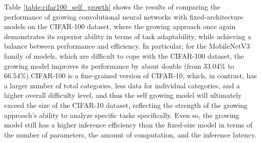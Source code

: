 \documentclass[preprint,12pt]{elsarticle}
\begin{document}
Table \ref{table:cifar100_self_growth} shows the results of comparing the performance of growing convolutional neural networks with fixed-architecture models on the CIFAR-100 dataset, where the growing approach once again demonstrates its superior ability in terms of task adaptability, while achieving a balance between performance and efficiency. In particular, for the MobileNetV3 family of models, which are difficult to cope with the CIFAR-100 dataset, the growing model improves its performance by about double (from 33.04\% to 66.54\%).CIFAR-100 is a fine-grained version of CIFAR-10, which, in contrast, has a larger number of total categories, less data for individual categories, and a higher overall difficulty level, and thus the self growing model will ultimately exceed the size of the CIFAR-10 dataset, reflecting the strength of the growing approach's ability to analyze specific tasks specifically. Even so, the growing model still has a higher inference efficiency than the fixed-size model in terms of the number of parameters, the amount of computation, and the inference latency.
\end{document}
